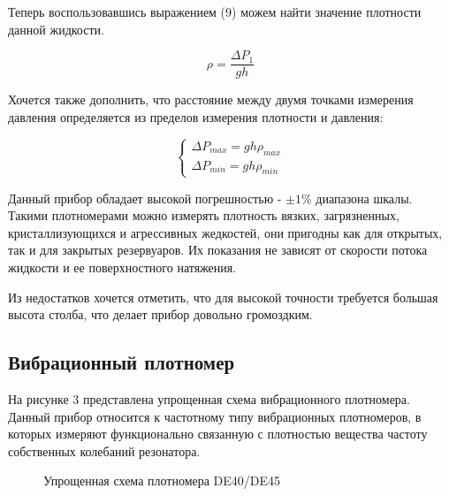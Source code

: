 \documentclass[russian, utf8, 12pt]{eskdtext}
\begin{document}
Теперь воспользовавшись выражением (9) можем найти значение плотности данной жидкости.

\begin{equation}
	\rho = \frac{\Delta P_1}{gh}
\end{equation}

Хочется также дополнить, что расстояние между двумя точками измерения давления определяется из пределов измерения плотности и давления: 

\begin{equation}
	\begin{cases}
		\Delta P_{max} = gh \rho_{max} \\
		\Delta P_{min} = gh \rho_{min}
	\end{cases}
\end{equation}

Данный прибор обладает высокой погрешностью - $\pm 1$\% диапазона шкалы. Такими плотномерами можно измерять плотность вязких, загрязненных, кристаллизующихся и агрессивных жедкостей, они пригодны как для открытых, так и для закрытых резервуаров. Их показания не зависят от скорости потока жидкости и ее поверхностного натяжения. \par

Из недостатков хочется отметить, что для высокой точности требуется большая высота столба, что делает прибор довольно громоздким.

\newpage

\subsection{Вибрационный плотномер}

На рисунке 3 представлена упрощенная схема вибрационного плотномера. Данный прибор относится к частотному типу вибрационных плотномеров, в которых измеряют функционально связанную с плотностью вещества частоту собственных колебаний резонатора.
\begin{figure}[h!]
	\centering
	\caption{Упрощенная схема плотномера DE40/DE45}
\end{figure}
\end{document}
